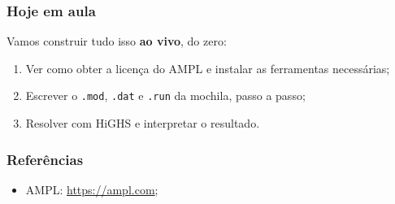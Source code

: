 \documentclass[fleqn]{beamer}
\begin{document}
\begin{frame}
	\frametitle{Hoje em aula}
	Vamos construir tudo isso \textbf{ao vivo}, do zero:
	\begin{enumerate}
		\item Ver como obter a licença do AMPL e instalar as ferramentas
			necessárias;
		\item Escrever o \texttt{.mod}, \texttt{.dat} e \texttt{.run} da
			mochila, passo a passo;
		\item Resolver com HiGHS e interpretar o resultado.
	\end{enumerate}
\end{frame}

\begin{frame}
	\frametitle{Referências}
	\begin{itemize}
		\item AMPL: \url{https://ampl.com};
	\end{itemize}
\end{frame}
\end{document}
